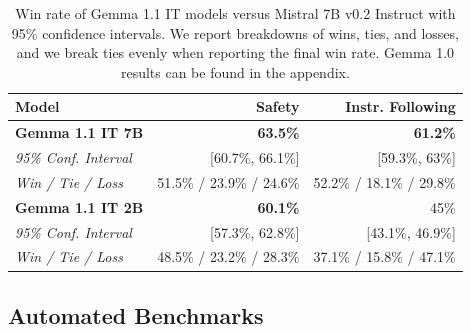 \documentclass[11pt, a4paper, logo, twocolumn, copyright, nonumbering]{googledeepmind}
\begin{document}
\begin{table}[t!]
    \setlength{\tabcolsep}{6pt}
    \centering
    \footnotesize
    \begin{tabular}{l r r}
    \toprule
    Model & Safety & Instr. Following \\
    \midrule
   \textbf{Gemma 1.1 IT 7B} & \textbf{63.5\%} &  \textbf{61.2\%} \\
\tiny{\textit{95\% Conf. Interval}} & \tiny{[60.7\%, 66.1\%]} & \tiny{[59.3\%, 63\%]} \vspace{-0.05cm} \\
\tiny{\textit{Win / Tie / Loss}} & \tiny{51.5\% / 23.9\% / 24.6\%} & \tiny{52.2\% / 18.1\% / 29.8\%} \vspace{0.2cm} \\
   \textbf{Gemma 1.1 IT 2B} & \textbf{60.1\%} &  45\% \\
\tiny{\textit{95\% Conf. Interval}} & \tiny{[57.3\%, 62.8\%]} & \tiny{[43.1\%, 46.9\%]}  \vspace{-0.05cm} \\
\tiny{\textit{Win / Tie / Loss}} & \tiny{48.5\% / 23.2\% / 28.3\%} & \tiny{37.1\% / 15.8\% / 47.1\%} \\
    \bottomrule
    \end{tabular}
    \caption{Win rate of Gemma 1.1 IT models versus Mistral 7B v0.2 Instruct with 95\% confidence intervals. We report breakdowns of wins, ties, and losses, and we break ties evenly when reporting the final win rate. Gemma 1.0 results can be found in the appendix.}
    \label{tab:it}
\end{table}

\subsection{Automated Benchmarks}
\end{document}
